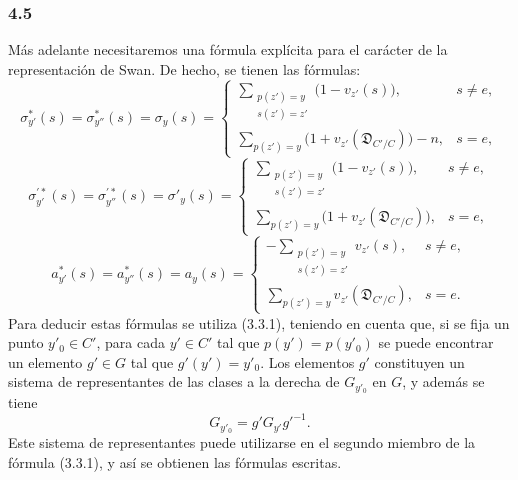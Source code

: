 \subsubsection*{4.5}

Más adelante necesitaremos una fórmula explícita para el carácter de la representación de Swan. De hecho, se tienen las fórmulas:
\[
\sigma^{*}_{y'}(s)=\sigma^{*}_{y''}(s)=\sigma_y(s)=
\begin{cases}
\displaystyle\sum_{\substack{p(z')=y\\s(z')=z'}}\bigl(1-v_{z'}(s)\bigr),& s\ne e,\\[0.8em]
\displaystyle\sum_{p(z')=y}\bigl(1+v_{z'}(\mathfrak D_{C'/C})\bigr)-n,& s=e,
\end{cases}
\tag{4.5.1}
\]
\[
\sigma^{\prime*}_{y'}(s)=\sigma^{\prime*}_{y''}(s)=\sigma'_y(s)=
\begin{cases}
\displaystyle\sum_{\substack{p(z')=y\\s(z')=z'}}\bigl(1-v_{z'}(s)\bigr),& s\ne e,\\[0.8em]
\displaystyle\sum_{p(z')=y}\bigl(1+v_{z'}(\mathfrak D_{C'/C})\bigr),& s=e,
\end{cases}
\tag{4.5.2}
\]
\[
a^{*}_{y'}(s)=a^{*}_{y''}(s)=a_y(s)=
\begin{cases}
\displaystyle-\sum_{\substack{p(z')=y\\s(z')=z'}}v_{z'}(s),& s\ne e,\\[0.8em]
\displaystyle\sum_{p(z')=y}v_{z'}(\mathfrak D_{C'/C}),& s=e.
\end{cases}
\tag{4.5.3}
\]
Para deducir estas fórmulas se utiliza (3.3.1), teniendo en cuenta que, si se fija un punto $y'_0\in C'$, para cada $y'\in C'$ tal que $p(y')=p(y'_0)$ se puede encontrar un elemento $g'\in G$ tal que $g'(y')=y'_0$. Los elementos $g'$ constituyen un sistema de representantes de las clases a la derecha de $G_{y'_0}$ en $G$, y además se tiene
\[
G_{y'_0}=g'G_{y'}g'^{-1}.
\]
Este sistema de representantes puede utilizarse en el segundo miembro de la fórmula (3.3.1), y así se obtienen las fórmulas escritas.
